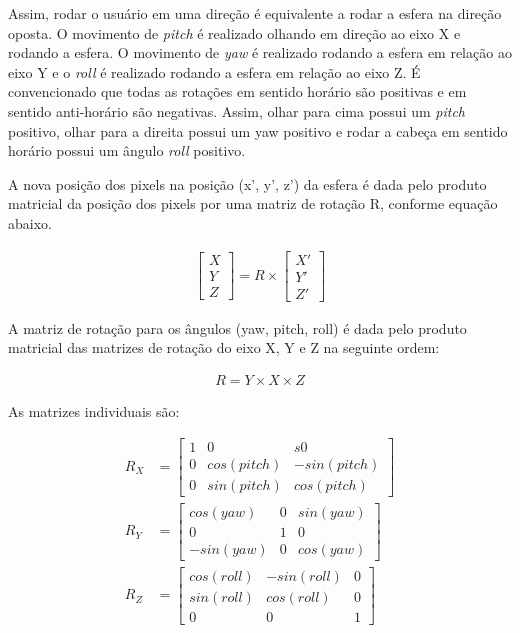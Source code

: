 {	Assim, rodar o usuário em uma direção é equivalente a rodar a esfera na direção oposta. O movimento de \textit{pitch} é realizado olhando em direção ao eixo X e rodando a esfera. O movimento de \textit{yaw} é realizado rodando a esfera em relação ao eixo Y e o \textit{roll} é realizado rodando a esfera em relação ao eixo Z. É convencionado que todas as rotações em sentido horário são positivas e em sentido anti-horário são negativas. Assim, olhar para cima possui um \textit{pitch} positivo, olhar para a direita possui um yaw positivo e rodar a cabeça em sentido horário possui um ângulo \textit{roll} positivo.
	
	A nova posição dos pixels na posição (x’, y’, z’) da esfera é dada pelo produto matricial da posição dos pixels por uma matriz de rotação R, conforme equação abaixo.
	
	\begin{align*}
		\begin{bmatrix}
			X\\
			Y\\
			Z
		\end{bmatrix}
		=
		R \times
		\begin{bmatrix}
			X'\\
			Y'\\
			Z'
		\end{bmatrix}
	\end{align*}
	
	A matriz de rotação para os ângulos (yaw, pitch, roll) é dada pelo produto matricial das matrizes de rotação do eixo X, Y e Z na seguinte ordem:
	
	\begin{align*}
		R=Y\times X\times Z
	\end{align*}
	
	As matrizes individuais são:
	
	\begin{align*}
		R_X &=\begin{bmatrix}
			1 & 0 & s0\\
			0 & cos(pitch) & -sin(pitch)\\
			0 & sin(pitch) & cos(pitch)
		\end{bmatrix}
		\\
		R_Y &=\begin{bmatrix}
			cos(yaw) & 0 & sin(yaw)\\
			0 & 1 & 0\\
			-sin(yaw) & 0 & cos(yaw)
		\end{bmatrix}
		\\
		R_Z &=\begin{bmatrix}
			cos(roll) & -sin(roll) & 0\\
			sin(roll) & cos(roll) & 0\\
			0 & 0 & 1
		\end{bmatrix}
	\end{align*}

}
